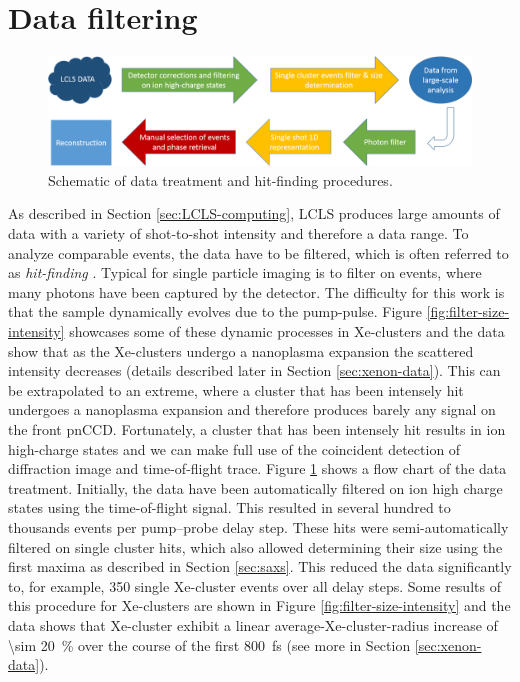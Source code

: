 \section{Data filtering}\label{sec:hitfinding}
\begin{figure}
	\centering
		\includegraphics[width=1.00\textwidth]{images/data-flow-chart.png}
	\caption{Schematic of data treatment and hit-finding procedures.}
	\label{fig:data-flow-chart}
\end{figure}
As described in Section \ref{sec:LCLS-computing}, LCLS produces large amounts of data with a variety of shot-to-shot intensity and therefore a data range. To analyze comparable events, the data have to be filtered, which is often referred to as \textit{hit-finding} \cite{Gorkhover-2012-PRL,Daurer-2016-JAC,Foucar-2016-JAC}. Typical for single particle imaging is to filter on events, where many photons have been captured by the detector. The difficulty for this work is that the sample dynamically evolves due to the pump-pulse. Figure \ref{fig:filter-size-intensity} showcases some of these dynamic processes in Xe-clusters and the data show that as the Xe-clusters undergo a nanoplasma expansion the scattered intensity decreases (details described later in Section \ref{sec:xenon-data}). This can be extrapolated to an extreme, where a cluster that has been intensely hit undergoes a nanoplasma expansion and therefore produces barely any signal on the front pnCCD. Fortunately, a cluster that has been intensely hit results in ion high-charge states and we can make full use of the coincident detection of diffraction image and time-of-flight trace. Figure \ref{fig:data-flow-chart} shows a flow chart of the data treatment. Initially, the data have been automatically filtered on ion high charge states using the time-of-flight signal. This resulted in several hundred to thousands events per pump--probe delay step. These hits were semi-automatically filtered on single cluster hits, which also allowed determining their size using the first maxima as described in Section \ref{sec:saxs}. This reduced the data significantly to, for example, 350 single Xe-cluster events over all delay steps. Some results of this procedure for Xe-clusters are shown in Figure \ref{fig:filter-size-intensity} and the data shows that Xe-cluster exhibit a linear average-Xe-cluster-radius increase of \SI{\sim 20}{\percent} over the course of the first \SI{800}{\femto\second} (see more in Section \ref{sec:xenon-data}).\\[1\baselineskip]
